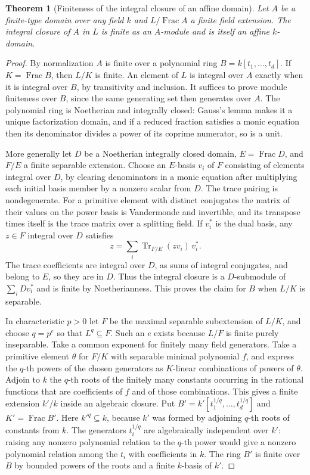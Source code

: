\documentclass[11pt,oneside,openany]{book}
\newtheorem{theorem}{Theorem}[chapter]
\theoremstyle{definition}
\theoremstyle{remark}
\begin{document}
\begin{theorem}[Finiteness of the integral closure of an affine domain]\label{p103:ALG-05-C01-S06}
Let \(A\) be a finite-type domain over any field \(k\) and \(L/\operatorname{Frac}A\) a finite field extension. The integral closure of \(A\) in \(L\) is finite as an \(A\)-module and is itself an affine \(k\)-domain.
\end{theorem}
\begin{proof}
By normalization \(A\) is finite over a polynomial ring \(B=k[t_1,\ldots,t_d]\). If \(K=\operatorname{Frac}B\), then \(L/K\) is finite. An element of \(L\) is integral over \(A\) exactly when it is integral over \(B\), by transitivity and inclusion. It suffices to prove module finiteness over \(B\), since the same generating set then generates over \(A\). The polynomial ring is Noetherian and integrally closed: Gauss's lemma makes it a unique factorization domain, and if a reduced fraction satisfies a monic equation then its denominator divides a power of its coprime numerator, so is a unit.

More generally let \(D\) be a Noetherian integrally closed domain, \(E=\operatorname{Frac}D\), and \(F/E\) a finite separable extension. Choose an \(E\)-basis \(v_i\) of \(F\) consisting of elements integral over \(D\), by clearing denominators in a monic equation after multiplying each initial basis member by a nonzero scalar from \(D\). The trace pairing is nondegenerate. For a primitive element with distinct conjugates the matrix of their values on the power basis is Vandermonde and invertible, and its transpose times itself is the trace matrix over a splitting field. If \(v_i^*\) is the dual basis, any \(z\in F\) integral over \(D\) satisfies
\[
 z=\sum_i \operatorname{Tr}_{F/E}(zv_i)\,v_i^* .
\]
The trace coefficients are integral over \(D\), as sums of integral conjugates, and belong to \(E\), so they are in \(D\). Thus the integral closure is a \(D\)-submodule of \(\sum_i Dv_i^*\) and is finite by Noetherianness. This proves the claim for \(B\) when \(L/K\) is separable.

In characteristic \(p>0\) let \(F\) be the maximal separable subextension of \(L/K\), and choose \(q=p^e\) so that \(L^q\subseteq F\). Such an \(e\) exists because \(L/F\) is finite purely inseparable. Take a common exponent for finitely many field generators. Take a primitive element \(\theta\) for \(F/K\) with separable minimal polynomial \(f\), and express the \(q\)-th powers of the chosen generators as \(K\)-linear combinations of powers of \(\theta\). Adjoin to \(k\) the \(q\)-th roots of the finitely many constants occurring in the rational functions that are coefficients of \(f\) and of those combinations. This gives a finite extension \(k'/k\) inside an algebraic closure. Put \(B'=k'[t_1^{1/q},\ldots,t_d^{1/q}]\) and \(K'=\operatorname{Frac}B'\). Here \(k'^q\subseteq k\), because \(k'\) was formed by adjoining \(q\)-th roots of constants from \(k\). The generators \(t_i^{1/q}\) are algebraically independent over \(k'\): raising any nonzero polynomial relation to the \(q\)-th power would give a nonzero polynomial relation among the \(t_i\) with coefficients in \(k\). The ring \(B'\) is finite over \(B\) by bounded powers of the roots and a finite \(k\)-basis of \(k'\).


\end{proof}
\end{document}
